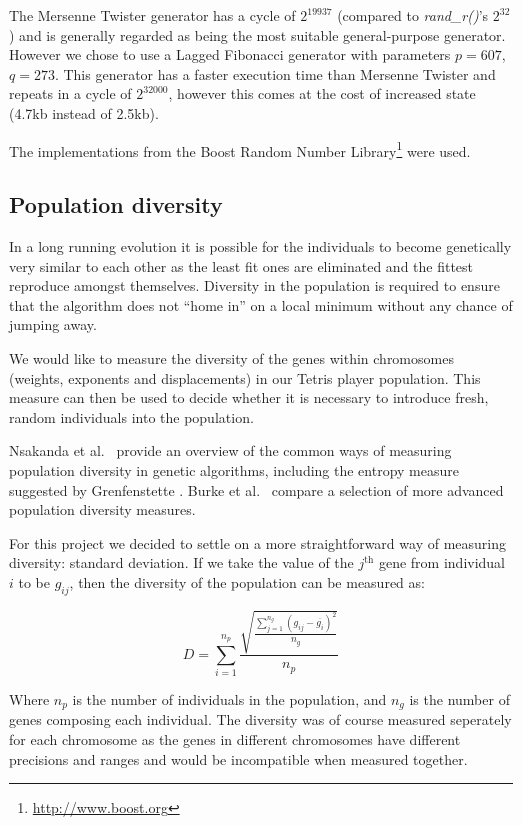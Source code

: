 \documentclass[a4paper,11pt]{article}
\begin{document}
The Mersenne Twister \cite{matsumoto1998mersenne} generator has a cycle of
$2^{19937}$ (compared to \emph{rand\_r()}'s $2^{32}$) and is generally regarded as
being the most suitable general-purpose generator.
However we chose to use a Lagged Fibonacci \cite{brent1992uniform} generator
with parameters $p=607$, $q=273$.
This generator has a faster execution time than Mersenne Twister and repeats in
a cycle of $2^{32000}$, however this comes at the cost of increased state (4.7kb
instead of 2.5kb).

The implementations from the Boost Random Number
Library\footnote{\url{http://www.boost.org}} were used.

\subsection{Population diversity}

In a long running evolution it is possible for the individuals to become
genetically very similar to each other as the least fit ones are eliminated and
the fittest reproduce amongst themselves.
Diversity in the population is required to ensure that the algorithm does not
``home in'' on a local minimum without any chance of jumping away.

We would like to measure the diversity of the genes within chromosomes (weights,
exponents and displacements) in our Tetris player population.
This measure can then be used to decide whether it is necessary to introduce
fresh, random individuals into the population.

Nsakanda et al.\ \cite{nsakanda2007ensuring} provide an overview of the common
ways of measuring population diversity in genetic algorithms, including the
entropy measure suggested by Grenfenstette \cite{grefenstette1987incorporating}.
Burke et al.\ \cite{burke2003advanced} compare a selection of more advanced
population diversity measures.

For this project we decided to settle on a more straightforward way of measuring
diversity: standard deviation.
If we take the value of the $j^\textrm{th}$ gene from individual $i$ to be
$g_{ij}$, then the diversity of the population can be measured as:

\begin{equation}
  D = \sum_{i=1}^{n_p} \frac{\sqrt{\frac{\sum_{j=1}^{n_g} (g_{ij} - \overline{g_i})^2 }{n_g}} }{n_p}
\end{equation}

Where $n_p$ is the number of individuals in the population, and $n_g$ is the
number of genes composing each individual.
The diversity was of course measured seperately for each chromosome as the
genes in different chromosomes have different precisions and ranges and would be
incompatible when measured together.
\end{document}
